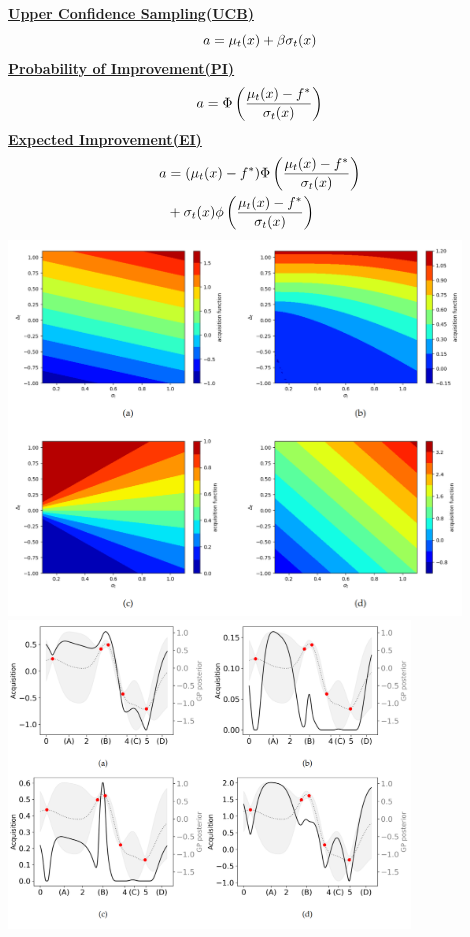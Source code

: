 \documentclass[landscape,a0paper,fontscale=0.285]{baposter} %
\begin{document}
\begin{poster}
{\underline{\textbf{Upper Confidence Sampling(UCB)}}
\vspace{-0.3cm}
$$\vspace{-0.3cm}
a = \mu_t(x) + \beta \sigma_t(x)
$$
\vspace{-0.3cm}
\underline{\textbf{Probability of Improvement(PI)}}
$$\vspace{-0.3cm}
a = \Phi\left(\frac{\mu_t(x)-f^*}{\sigma_t(x)}\right)
$$
\vspace{-0.3cm}
\underline{\textbf{Expected Improvement(EI)}}
$$\vspace{-0.3cm}
\begin{aligned}
a &= (\mu_t(x)-f^*)\Phi\left(\frac{\mu_t(x)-f^*}{\sigma_t(x)}\right) \\
&+ \sigma_t(x)\phi\left(\frac{\mu_t(x)-f^*}{\sigma_t(x)}\right)
\end{aligned}
$$
\vspace{-0.3cm}
\includegraphics[width=0.9\textwidth, trim={0cm 1cm 0 0.2cm},clip]{figures/yzAfp5mekGTuO7w.png}
\includegraphics[width=0.8\textwidth,trim={0cm 1cm 0 0.2cm},clip]{figures/FqXAlIgS45KoYxp.png}

}
\end{poster}
\end{document}
